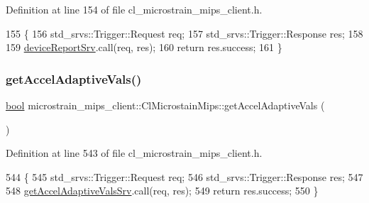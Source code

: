 Definition at line 154 of file cl\+\_\+microstrain\+\_\+mips\+\_\+client.\+h.


\begin{DoxyCode}
155     \{
156         std\_srvs::Trigger::Request req;
157         std\_srvs::Trigger::Response res;
158 
159         \hyperlink{classmicrostrain__mips__client_1_1ClMicrostainMips_a7d7f4bfa828c87c27e1b7cab613e42e1}{deviceReportSrv}.call(req, res);
160         \textcolor{keywordflow}{return} res.success;
161     \}
\end{DoxyCode}
\mbox{\label{classmicrostrain__mips__client_1_1ClMicrostainMips_a29413fde4bc81d0a61ae9b7dba692182}} 
\subsubsection{\texorpdfstring{get\+Accel\+Adaptive\+Vals()}{getAccelAdaptiveVals()}}
{\footnotesize\ttfamily \hyperlink{classbool}{bool} microstrain\+\_\+mips\+\_\+client\+::\+Cl\+Microstain\+Mips\+::get\+Accel\+Adaptive\+Vals (\begin{DoxyParamCaption}{ }\end{DoxyParamCaption})\hspace{0.3cm}{\ttfamily [inline]}}



Definition at line 543 of file cl\+\_\+microstrain\+\_\+mips\+\_\+client.\+h.


\begin{DoxyCode}
544     \{
545         std\_srvs::Trigger::Request req;
546         std\_srvs::Trigger::Response res;
547 
548         \hyperlink{classmicrostrain__mips__client_1_1ClMicrostainMips_ad3a6f23505de5793b9cf107306e8a649}{getAccelAdaptiveValsSrv}.call(req, res);
549         \textcolor{keywordflow}{return} res.success;
550     \}
\end{DoxyCode}
\mbox{\label{classmicrostrain__mips__client_1_1ClMicrostainMips_a21083a65193b40c4121814e9d17a7a29}} 

